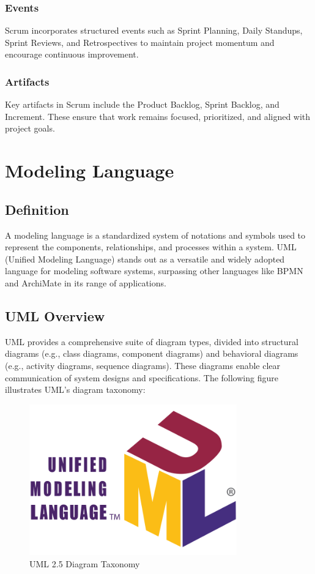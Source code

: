 \subsubsection{Events}
Scrum incorporates structured events such as Sprint Planning, Daily Standups, Sprint Reviews, and Retrospectives to maintain project momentum and encourage continuous improvement.

\subsubsection{Artifacts}
Key artifacts in Scrum include the Product Backlog, Sprint Backlog, and Increment. These ensure that work remains focused, prioritized, and aligned with project goals.

\section{Modeling Language}
\subsection{Definition}
A modeling language is a standardized system of notations and symbols used to represent the components, relationships, and processes within a system. UML (Unified Modeling Language) stands out as a versatile and widely adopted language for modeling software systems, surpassing other languages like BPMN and ArchiMate in its range of applications.

\subsection{UML Overview}
UML provides a comprehensive suite of diagram types, divided into structural diagrams (e.g., class diagrams, component diagrams) and behavioral diagrams (e.g., activity diagrams, sequence diagrams). These diagrams enable clear communication of system designs and specifications. The following figure illustrates UML's diagram taxonomy:

\begin{figure}[h!]
    \centering
    \includegraphics[width=0.8\textwidth]{pictures/web/UML_logo.svg.png}
    \caption{UML 2.5 Diagram Taxonomy}
\end{figure}

